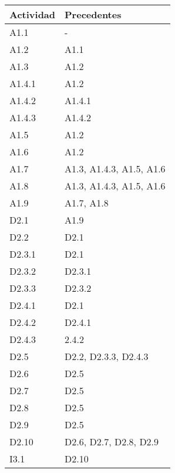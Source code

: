 \documentclass[11pt,a4paper,spanish,twoside]{report}
\begin{document}
\begin{table}[!h]
  \centering
  \small
  \begin{tabular}{l|l}
    \textbf{Actividad} & \textbf{Precedentes}\\
    \hline \hline
    A1.1   & -                        \\
    \hline
    A1.2   & A1.1                     \\
    \hline
    A1.3   & A1.2                     \\
    \hline
    A1.4.1 & A1.2                     \\
    \hline
    A1.4.2 & A1.4.1                   \\
    \hline
    A1.4.3 & A1.4.2                   \\
    \hline
    A1.5   & A1.2                     \\
    \hline
    A1.6   & A1.2                     \\
    \hline
    A1.7   & A1.3, A1.4.3, A1.5, A1.6 \\
    \hline
    A1.8   & A1.3, A1.4.3, A1.5, A1.6 \\
    \hline
    A1.9   & A1.7, A1.8               \\
    \hline
    D2.1   & A1.9                     \\
    \hline
    D2.2   & D2.1                     \\
    \hline
    D2.3.1 & D2.1                     \\
    \hline
    D2.3.2 & D2.3.1                   \\
    \hline
    D2.3.3 & D2.3.2                   \\
    \hline
    D2.4.1 & D2.1                     \\
    \hline
    D2.4.2 & D2.4.1                   \\
    \hline
    D2.4.3 & 2.4.2                    \\
    \hline
    D2.5   & D2.2, D2.3.3, D2.4.3     \\
    \hline
    D2.6   & D2.5                     \\
    \hline
    D2.7   & D2.5                     \\
    \hline
    D2.8   & D2.5                     \\
    \hline
    D2.9   & D2.5                     \\
    \hline
    D2.10  & D2.6, D2.7, D2.8, D2.9   \\
    \hline
    I3.1   & D2.10                    \\

\end{tabular}
\end{table}
\end{document}
